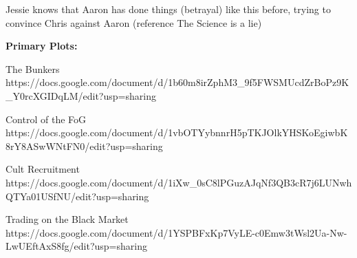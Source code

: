 \documentclass[char]{GL2020}
\begin{document}
\name{\cChupSecond{}}


Jessie knows that Aaron has done things (betrayal) like this before, trying to convince Chris against Aaron (reference The Science is a lie)








\textbf{Primary Plots:}

The Bunkers https://docs.google.com/document/d/1b60m8irZphM3_9f5FWSMUcdZrBoPz9K_Y0rcXGIDqLM/edit?usp=sharing

Control of the FoG https://docs.google.com/document/d/1vbOTYybnnrH5pTKJOlkYHSKoEgiwbK8rY8ASwWNtFN0/edit?usp=sharing

Cult Recruitment https://docs.google.com/document/d/1iXw_0sC8lPGuzAJqNf3QB3cR7j6LUNwhQTYa01USfNU/edit?usp=sharing

Trading on the Black Market https://docs.google.com/document/d/1YSPBFxKp7VyLE-c0Emw3tWsl2Ua-Nw-LwUEftAxS8fg/edit?usp=sharing
\end{document}
